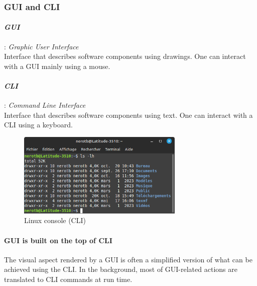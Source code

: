 \documentclass[11pt]{article}
\begin{document}
			\subsubsection{GUI and CLI}

				\paragraph{\textit{GUI}}: \textit{Graphic User Interface} \\
					Interface that describes software components using drawings. One can interact with a GUI mainly using a mouse.

				\paragraph{\textit{CLI}}: \textit{Command Line Interface} \\
					Interface that describes software components using text. One can interact with a CLI using a keyboard.
					\begin{figure}[!h]
							\centering
							\includegraphics[width=300px]{figures/CLI.png}
							\caption{Linux console (CLI)}
					\end{figure}

				\paragraph{GUI is built on the top of CLI}
					The visual aspect rendered by a GUI is often a simplified version of what can be achieved using the CLI. In the 
					background, most of GUI-related actions are translated to CLI commands at run time.
\end{document}
